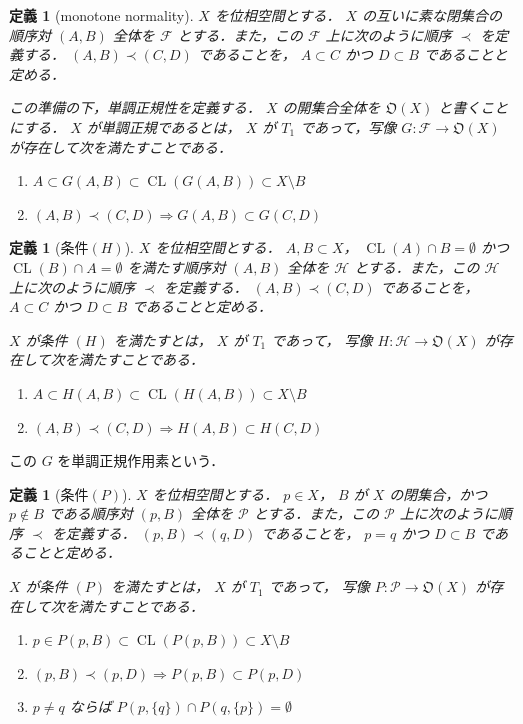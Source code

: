 \documentclass[leqno, 12pt]{ltjsarticle}
\newtheorem{df}[thm]{定義}
\newcommand{\To}{\Longrightarrow}
\newcommand{\OpenSets}[1]{\mathfrak{O}(#1)}
\DeclareMathOperator{\cl}{CL}
\begin{document}
\begin{df}[monotone normality]
$X$
を位相空間とする．
$X$
の互いに素な閉集合の順序対
$(A,B)$
全体を
$\mathcal{F}$
とする．また，この
$\mathcal{F}$
上に次のように順序
$\prec$
を定義する．
$(A,B)\prec(C,D)$
であることを，
$A\subset C$
かつ
$D\subset B$
であることと定める．


この準備の下，単調正規性を定義する．
$X$
の開集合全体を
$\OpenSets{X}$
と書くことにする．
$X$
が単調正規であるとは，
$X$
が
$T_{1}$
であって，写像
$G:\mathcal{F}\to \OpenSets{X}$
が存在して次を満たすことである．
\begin{enumerate}[label=\textup{(\arabic*)}]
\item
$A\subset G(A, B)\subset \cl(G(A,B))\subset X\setminus B$
\item
$(A,B)\prec (C,D)\To G(A,B)\subset G(C,D)$
\end{enumerate}
\end{df}

\begin{df}[条件$(H)$]
$X$
を位相空間とする．
$A,B\subset X$，
$\cl(A)\cap B=\emptyset$
かつ
$\cl(B)\cap A=\emptyset$
を満たす順序対
$(A,B)$
全体を
$\mathcal{H}$
とする．また，この
$\mathcal{H}$
上に次のように順序
$\prec$
を定義する．
$(A,B)\prec(C,D)$
であることを，
$A\subset C$
かつ
$D\subset B$
であることと定める．

$X$
が条件
$(H)$
を満たすとは，
$X$
が
$T_{1}$
であって，
写像
$H:\mathcal{H}\to \OpenSets{X}$
が存在して次を満たすことである．
\begin{enumerate}[label=\textup{(\arabic*)}]
\item
$A\subset H(A, B)\subset \cl(H(A,B))\subset X\setminus B$
\item
$(A,B)\prec (C,D)\To H(A,B)\subset H(C,D)$
\end{enumerate}
\end{df}

この
$G$
を単調正規作用素という．
\begin{df}[条件$(P)$]
$X$
を位相空間とする．
$p\in X$，
$B$
が
$X$
の閉集合，かつ
$p\notin B$
である順序対
$(p,B)$
全体を
$\mathcal{P}$
とする．また，この
$\mathcal{P}$
上に次のように順序
$\prec$
を定義する．
$(p,B)\prec(q,D)$
であることを，
$p=q$
かつ
$D\subset B$
であることと定める．

$X$
が条件
$(P)$
を満たすとは，
$X$
が
$T_{1}$
であって，
写像
$P:\mathcal{P}\to \OpenSets{X}$
が存在して次を満たすことである．
\begin{enumerate}[label=\textup{(\arabic*)}]
\item
$p\in P(p, B)\subset \cl(P(p,B))\subset X\setminus B$
\item
$(p,B)\prec (p,D)\To P(p,B)\subset P(p,D)$
\item
$p\neq q$
ならば
$P(p, \{q\})\cap P(q,\{p\})=\emptyset$
\end{enumerate}
\end{df}
\end{document}
